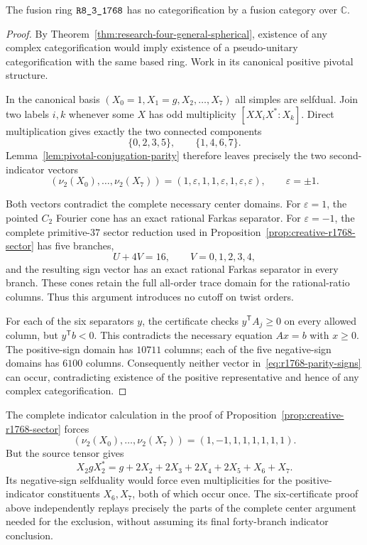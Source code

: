 \begin{theorem}
\label{thm:r1768-general-exclusion}
The fusion ring $\sha{R8_3_1768}$ has no categorification by a fusion
category over $\mathbb C$.
\end{theorem}
\begin{proof}
By Theorem~\ref{thm:research-four-general-spherical}, existence of any
complex categorification would imply existence of a pseudo-unitary
categorification with the same based ring.  Work in its canonical
positive pivotal structure.

In the canonical basis $(X_0=1,X_1=g,X_2,\ldots,X_7)$ all simples are
selfdual.  Join two labels $i,k$ whenever some $X$ has odd multiplicity
$[X X_i X^*:X_k]$.  Direct multiplication gives exactly the two connected
components
\[
 \{0,2,3,5\},\qquad \{1,4,6,7\}.
\]
Lemma~\ref{lem:pivotal-conjugation-parity} therefore leaves precisely
the two second-indicator vectors
\begin{equation}\label{eq:r1768-parity-signs}
 (\nu_2(X_0),\ldots,\nu_2(X_7))
 =(1,\varepsilon,1,1,\varepsilon,1,\varepsilon,\varepsilon),
 \qquad\varepsilon=\pm1.
\end{equation}

Both vectors contradict the complete necessary center domains.  For
$\varepsilon=1$, the pointed $C_2$ Fourier cone has an exact rational
Farkas separator.  For $\varepsilon=-1$, the complete primitive-$37$
sector reduction used in Proposition~\ref{prop:creative-r1768-sector}
has five branches,
\[
 U+4V=16,\qquad V=0,1,2,3,4,
\]
and the resulting sign vector has an exact rational Farkas separator
in every branch.  These cones retain the full all-order trace domain
for the rational-ratio columns.  Thus this argument introduces no
cutoff on twist orders.

For each of the six separators $y$, the certificate checks
$y^{\mathsf T}A_j\ge0$ on every allowed column, but
$y^{\mathsf T}b<0$.  This contradicts the necessary equation
$Ax=b$ with $x\ge0$.  The positive-sign domain has $10711$ columns;
each of the five negative-sign domains has $6100$ columns.
Consequently neither vector in~\eqref{eq:r1768-parity-signs} can occur,
contradicting existence of the positive representative and hence of
any complex categorification.
\end{proof}

The complete indicator
calculation in the proof of
Proposition~\ref{prop:creative-r1768-sector} forces
\[
 (\nu_2(X_0),\ldots,\nu_2(X_7))=(1,-1,1,1,1,1,1,1).
\]
But the source tensor gives
\[
 X_2gX_2^*
 =g+2X_2+2X_3+2X_4+2X_5+X_6+X_7.
\]
Its negative-sign selfduality would force even multiplicities for the
positive-indicator constituents $X_6,X_7$, both of which occur once.
The six-certificate proof above independently replays precisely the
parts of the complete center argument needed for the exclusion,
without assuming its final forty-branch indicator conclusion.

